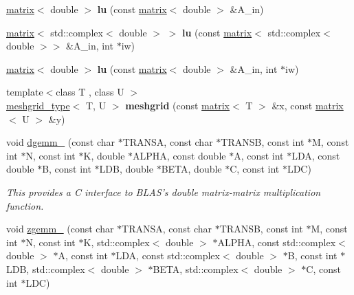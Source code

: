 \begin{DoxyCompactItemize}
\item 
\hypertarget{namespacekeycpp_ac6e9ba154bce04912b775584590b4815}{\hyperlink{classkeycpp_1_1matrix}{matrix}$<$ double $>$ {\bfseries lu} (const \hyperlink{classkeycpp_1_1matrix}{matrix}$<$ double $>$ \&A\-\_\-in)}\label{namespacekeycpp_ac6e9ba154bce04912b775584590b4815}

\item 
\hypertarget{namespacekeycpp_a870bd38d5e2dbf79da93073b9d2d5d9e}{\hyperlink{classkeycpp_1_1matrix}{matrix}$<$ std\-::complex$<$ double $>$ $>$ {\bfseries lu} (const \hyperlink{classkeycpp_1_1matrix}{matrix}$<$ std\-::complex$<$ double $>$$>$ \&A\-\_\-in, int $\ast$iw)}\label{namespacekeycpp_a870bd38d5e2dbf79da93073b9d2d5d9e}

\item 
\hypertarget{namespacekeycpp_ac6ada4f2aa379b6d31cf0a4e1453f809}{\hyperlink{classkeycpp_1_1matrix}{matrix}$<$ double $>$ {\bfseries lu} (const \hyperlink{classkeycpp_1_1matrix}{matrix}$<$ double $>$ \&A\-\_\-in, int $\ast$iw)}\label{namespacekeycpp_ac6ada4f2aa379b6d31cf0a4e1453f809}

\item 
\hypertarget{namespacekeycpp_a29c6eeb7d95bad691033adf85020becc}{{\footnotesize template$<$class T , class U $>$ }\\\hyperlink{structkeycpp_1_1meshgrid__type}{meshgrid\-\_\-type}$<$ T, U $>$ {\bfseries meshgrid} (const \hyperlink{classkeycpp_1_1matrix}{matrix}$<$ T $>$ \&x, const \hyperlink{classkeycpp_1_1matrix}{matrix}$<$ U $>$ \&y)}\label{namespacekeycpp_a29c6eeb7d95bad691033adf85020becc}

\item 
\hypertarget{namespacekeycpp_a16b58f47ed977cafdc96227468f5f10a}{void \hyperlink{namespacekeycpp_a16b58f47ed977cafdc96227468f5f10a}{dgemm\-\_\-} (const char $\ast$T\-R\-A\-N\-S\-A, const char $\ast$T\-R\-A\-N\-S\-B, const int $\ast$M, const int $\ast$N, const int $\ast$K, double $\ast$A\-L\-P\-H\-A, const double $\ast$A, const int $\ast$L\-D\-A, const double $\ast$B, const int $\ast$L\-D\-B, double $\ast$B\-E\-T\-A, double $\ast$C, const int $\ast$L\-D\-C)}\label{namespacekeycpp_a16b58f47ed977cafdc96227468f5f10a}

\begin{DoxyCompactList}\small\item\em This provides a C interface to B\-L\-A\-S's double matrix-\/matrix multiplication function. \end{DoxyCompactList}\item 
\hypertarget{namespacekeycpp_a29fb4e46ee1b9cce0fd8bc79a2490c72}{void \hyperlink{namespacekeycpp_a29fb4e46ee1b9cce0fd8bc79a2490c72}{zgemm\-\_\-} (const char $\ast$T\-R\-A\-N\-S\-A, const char $\ast$T\-R\-A\-N\-S\-B, const int $\ast$M, const int $\ast$N, const int $\ast$K, std\-::complex$<$ double $>$ $\ast$A\-L\-P\-H\-A, const std\-::complex$<$ double $>$ $\ast$A, const int $\ast$L\-D\-A, const std\-::complex$<$ double $>$ $\ast$B, const int $\ast$L\-D\-B, std\-::complex$<$ double $>$ $\ast$B\-E\-T\-A, std\-::complex$<$ double $>$ $\ast$C, const int $\ast$L\-D\-C)}\label{namespacekeycpp_a29fb4e46ee1b9cce0fd8bc79a2490c72}


\end{DoxyCompactItemize}
